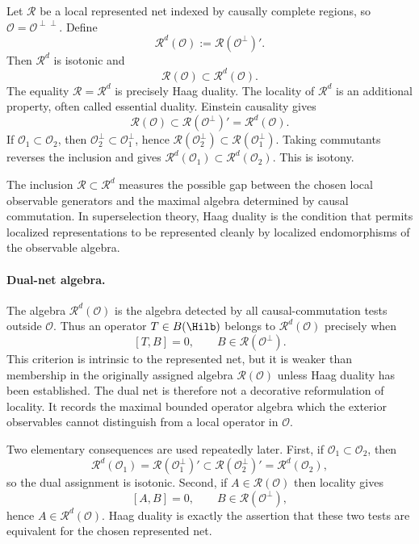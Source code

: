 Let \(\mathcal R\) be a local represented net indexed by causally complete
regions, so \(\mathcal O=\mathcal O^{\perp\perp}\).  Define
\[
  \mathcal R^d(\mathcal O):=\mathcal R(\mathcal O^\perp)' .
\]
Then \(\mathcal R^d\) is isotonic and
\[
  \mathcal R(\mathcal O)\subset\mathcal R^d(\mathcal O).
\]
The equality \(\mathcal R=\mathcal R^d\) is precisely Haag duality.  The
locality of \(\mathcal R^d\) is an additional property, often called
essential duality.
Einstein causality gives
\[
  \mathcal R(\mathcal O)\subset \mathcal R(\mathcal O^\perp)'
  =
  \mathcal R^d(\mathcal O).
\]
If \(\mathcal O_1\subset\mathcal O_2\), then
\(\mathcal O_2^\perp\subset\mathcal O_1^\perp\), hence
\(\mathcal R(\mathcal O_2^\perp)\subset\mathcal R(\mathcal O_1^\perp)\).
Taking commutants reverses the inclusion and gives
\(\mathcal R^d(\mathcal O_1)\subset\mathcal R^d(\mathcal O_2)\).  This is
isotony.

The inclusion \(\mathcal R\subset\mathcal R^d\) measures the possible gap
between the chosen local observable generators and the maximal algebra
determined by causal commutation.  In superselection theory, Haag duality is
the condition that permits localized representations to be represented
cleanly by localized endomorphisms of the observable algebra.

\paragraph{Dual-net algebra.}
The algebra \(\mathcal R^d(\mathcal O)\) is the algebra detected by all
causal-commutation tests outside \(\mathcal O\).  Thus an operator
\(T\in B(\Hilb)\) belongs to \(\mathcal R^d(\mathcal O)\) precisely when
\[
  [T,B]=0,\qquad B\in\mathcal R(\mathcal O^\perp).
\]
This criterion is intrinsic to the represented net, but it is weaker than
membership in the originally assigned algebra \(\mathcal R(\mathcal O)\)
unless Haag duality has been established.  The dual net is therefore not a
decorative reformulation of locality.  It records the maximal bounded
operator algebra which the exterior observables cannot distinguish from a
local operator in \(\mathcal O\).

Two elementary consequences are used repeatedly later.  First, if
\(\mathcal O_1\subset\mathcal O_2\), then
\[
  \mathcal R^d(\mathcal O_1)
  =
  \mathcal R(\mathcal O_1^\perp)'
  \subset
  \mathcal R(\mathcal O_2^\perp)'
  =
  \mathcal R^d(\mathcal O_2),
\]
so the dual assignment is isotonic.  Second, if \(A\in\mathcal R(\mathcal O)\)
then locality gives
\[
  [A,B]=0,\qquad B\in\mathcal R(\mathcal O^\perp),
\]
hence \(A\in\mathcal R^d(\mathcal O)\).  Haag duality is exactly the assertion
that these two tests are equivalent for the chosen represented net.

